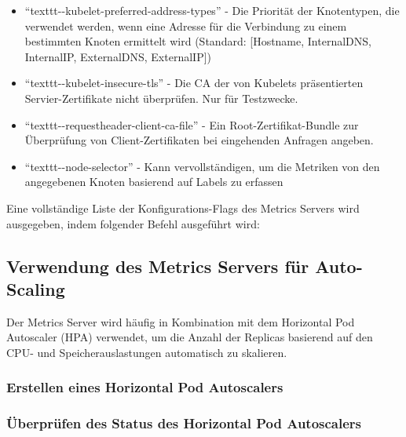 \begin{itemize}
    \item \enquote{texttt{{-}{-}kubelet-preferred-address-types}} - Die Priorität der Knotentypen, die verwendet werden, wenn eine Adresse für die Verbindung zu einem bestimmten Knoten ermittelt wird (Standard: [Hostname, InternalDNS, InternalIP, ExternalDNS, ExternalIP])
    \item \enquote{texttt{{-}{-}kubelet-insecure-tls}} - Die CA der von Kubelets präsentierten Servier-Zertifikate nicht überprüfen. Nur für Testzwecke.
    \item \enquote{texttt{{-}{-}requestheader-client-ca-file}} - Ein Root-Zertifikat-Bundle zur Überprüfung von Client-Zertifikaten bei eingehenden Anfragen angeben.
    \item \enquote{texttt{{-}{-}node-selector}} - Kann vervollständigen, um die Metriken von den angegebenen Knoten basierend auf Labels zu erfassen
\end{itemize}

Eine vollständige Liste der Konfigurations-Flags des Metrics Servers wird ausgegeben, indem folgender Befehl ausgeführt wird:



\subsection{Verwendung des Metrics Servers für Auto-Scaling}
Der Metrics Server wird häufig in Kombination mit dem Horizontal Pod Autoscaler (HPA) verwendet, um die Anzahl der Replicas basierend auf den CPU- und Speicherauslastungen automatisch zu skalieren.

\subsubsection{Erstellen eines Horizontal Pod Autoscalers}



\subsubsection{Überprüfen des Status des Horizontal Pod Autoscalers}



